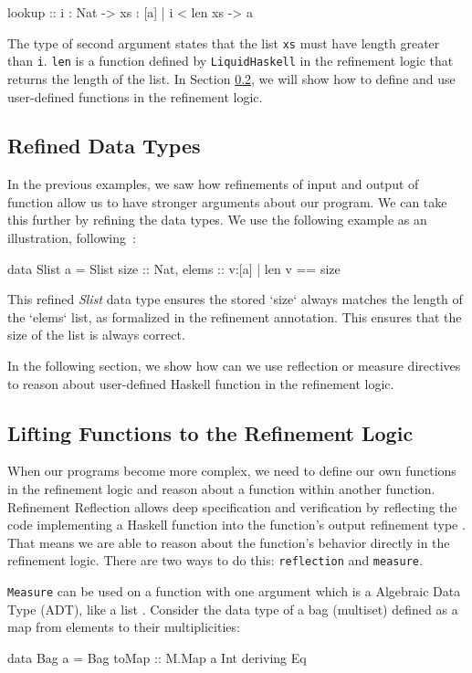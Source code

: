 \begin{code}
	lookup :: i : Nat -> xs : {[a] | i < len xs} -> a
\end{code}

The type of second argument states that the list \texttt{xs} must have length greater than \texttt{i}.
\texttt{len} is a function defined by \texttt{LiquidHaskell} in the refinement logic that returns the length of the list.
In Section \ref{sec:reflection}, we will show how to define and use user-defined functions in the refinement logic.

\subsection{Refined Data Types}
In the previous examples, we saw how refinements of input and output of function allow us to have stronger arguments about our program.
We can take this further by refining the data types.
We use the following example as an illustration, following~\cite{jhala2020}:
\begin{code}
	data Slist a = Slist {
	size :: Nat,
	elems :: {v:[a] | len v == size}
	}
\end{code}

This refined \textit{Slist} data type ensures the stored `size` always matches the length of the `elems` list,
as formalized in the refinement annotation.
This ensures that the size of the list is always correct.

In the following section, we show how can we use reflection or measure directives to reason about user-defined Haskell function in the refinement logic.

\subsection{Lifting Functions to the Refinement Logic}
\label{sec:reflection}
When our programs become more complex, we need to define our own functions in the refinement logic and reason about
a function within another function. Refinement Reflection allows deep specification and verification by
reflecting the code implementing a Haskell function into the function’s output refinement type \cite{vazou2018}.
That means we are able to reason about the function's behavior directly in the refinement logic.
There are two ways to do this: \texttt{reflection} and \texttt{measure}.

\texttt{Measure} can be used on a function with one argument which is a Algebraic Data Type (ADT), like a list \cite{niki_lecture_2024}.
Consider the data type of a bag (multiset) defined as a map from elements to their multiplicities:
\begin{code}
	data Bag a = Bag { toMap :: M.Map a Int } deriving Eq
\end{code}


